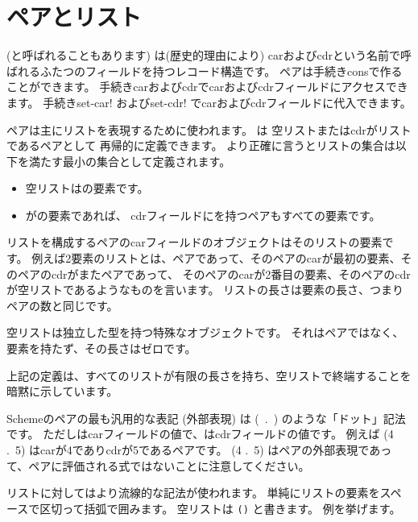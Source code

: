 \section{ペアとリスト}
\label{listsection}

 (と呼ばれることもあります)
は(歴史的理由により) carおよびcdrという名前で呼ばれるふたつのフィールドを持つレコード構造です。
ペアは手続き{\cf cons}で作ることができます。
手続き{\cf car}および{\cf cdr}でcarおよびcdrフィールドにアクセスできます。
手続き{\cf set-car!} および{\cf set-cdr!} でcarおよびcdrフィールドに代入できます。

ペアは主にリストを表現するために使われます。
は
空リストまたはcdrがリストであるペアとして
再帰的に定義できます。
より正確に言うとリストの集合は以下を満たす最小の集合として定義されます。

\begin{itemize}
\item 空リストはの要素です。
\item {}がの要素であれば、
      cdrフィールドにを持つペアもすべての要素です。
\end{itemize}

リストを構成するペアのcarフィールドのオブジェクトはそのリストの要素です。
例えば2要素のリストとは、ペアであって、そのペアのcarが最初の要素、そのペアのcdrがまたペアであって、
そのペアのcarが2番目の要素、そのペアのcdrが空リストであるようなものを言います。
リストの長さは要素の長さ、つまりペアの数と同じです。

空リストは独立した型を持つ特殊なオブジェクトです。
それはペアではなく、要素を持たず、その長さはゼロです。

\begin{note}
上記の定義は、すべてのリストが有限の長さを持ち、空リストで終端することを暗黙に示しています。
\end{note}

Schemeのペアの最も汎用的な表記 (外部表現) は
\hbox{\cf ( .\ )}
のような「ドット」記法です。
ただしはcarフィールドの値で、はcdrフィールドの値です。
例えば {\cf (4 .\ 5)} はcarが4でありcdrが5であるペアです。
{\cf (4 .\ 5)} はペアの外部表現であって、ペアに評価される式ではないことに注意してください。

リストに対してはより流線的な記法が使われます。
単純にリストの要素をスペースで区切って括弧で囲みます。
空リストは {\tt()} と書きます。
例を挙げます。

